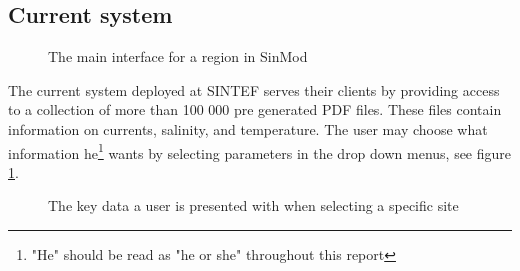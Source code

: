 \documentclass[11pt,a4paper,titlepage,oneside]{report}
\begin{document}
\subsection{Current system}
\begin{figure}[h]
\begin{center}
\caption{The main interface for a region in SinMod}
\label{fig:sinmod-region-main-interface}
\end{center}
\end{figure}

The current system deployed at SINTEF serves their clients by providing access to a collection of more than 100 000 pre generated PDF files. These files contain information on currents, salinity, and temperature. The user may choose what information he\footnote{"He" should be read as "he or she" throughout this report} wants by selecting parameters in the drop down menus, see figure \ref{fig:sinmod-region-main-interface}.

\begin{figure}[h]
\begin{center}
\caption{The key data a user is presented with when selecting a specific site}
\label{fig:sinmod-site-key-data}
\end{center}
\end{figure}
\end{document}
